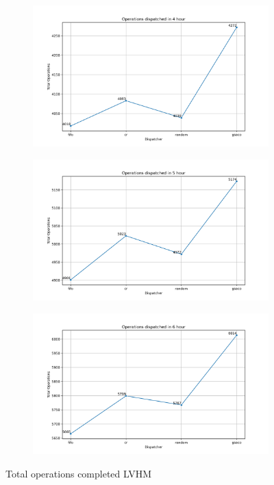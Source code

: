 \begin{figure}[ht]
\begin{subfigure}{0.32\textwidth}
		\caption{}
		\label{fig:o3}
	\end{subfigure}
	\begin{subfigure}{0.32\textwidth}
		\includegraphics[width=\textwidth]{LVHM/total_operations_14400s.png}
		\caption{}
		\label{fig:o4}
	\end{subfigure}\hfill
	\begin{subfigure}{0.32\textwidth}
		\includegraphics[width=\textwidth]{LVHM/total_operations_18000s.png}
		\caption{}
		\label{fig:o5}
	\end{subfigure}\hfill
	\begin{subfigure}{0.32\textwidth}
		\includegraphics[width=\textwidth]{LVHM/total_operations_21600s.png}
		\caption{}
		\label{fig:o6}
	\end{subfigure}
	\caption{Total operations completed LVHM}
	\label{fig:totalopsLVHM}
\end{figure}